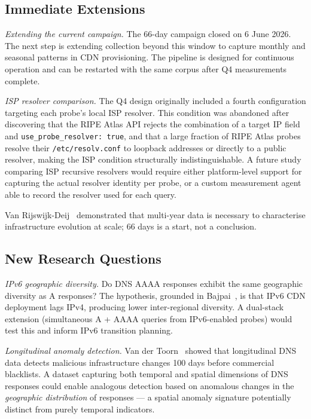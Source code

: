 \bigskip
\subsection{Immediate Extensions}
\label{subsec:5.4.1}

\textit{Extending the current campaign.}
The 66-day campaign closed on 6 June 2026. The next step is extending collection beyond this window to capture monthly and seasonal patterns in \ac{CDN} provisioning. The pipeline is designed for continuous operation and can be restarted with the same corpus after Q4 measurements complete.

\textit{ISP resolver comparison.}
The Q4 design originally included a fourth configuration targeting each probe's local \ac{ISP} resolver. This condition was abandoned after discovering that the RIPE Atlas \ac{API} rejects the combination of a target \ac{IP} field and \texttt{use\_probe\_resolver: true}, and that a large fraction of RIPE Atlas probes resolve their \texttt{/etc/resolv.conf} to loopback addresses or directly to a public resolver, making the \ac{ISP} condition structurally indistinguishable. A future study comparing \ac{ISP} recursive resolvers would require either platform-level support for capturing the actual resolver identity per probe, or a custom measurement agent able to record the resolver used for each query.

Van Rijswijk-Deij~\cite{vanRijswijk2016} demonstrated that multi-year data is necessary to characterise infrastructure evolution at scale; 66 days is a start, not a conclusion.

\bigskip
\subsection{New Research Questions}
\label{subsec:5.4.2}

\textit{\ac{IPv6} geographic diversity.}
Do \ac{DNS} \ac{AAAA} responses exhibit the same geographic diversity as \ac{A} responses? The hypothesis, grounded in Bajpai~\cite{Bajpai2017}, is that \ac{IPv6} \ac{CDN} deployment lags \ac{IPv4}, producing lower inter-regional diversity. A dual-stack extension (simultaneous \ac{A} + \ac{AAAA} queries from \ac{IPv6}-enabled probes) would test this and inform \ac{IPv6} transition planning.

\textit{Longitudinal anomaly detection.}
Van der Toorn~\cite{vanderToorn2018} showed that longitudinal \ac{DNS} data detects malicious infrastructure changes 100 days before commercial blacklists. A dataset capturing both temporal and spatial dimensions of \ac{DNS} responses could enable analogous detection based on anomalous changes in the \emph{geographic distribution} of responses --- a spatial anomaly signature potentially distinct from purely temporal indicators.

